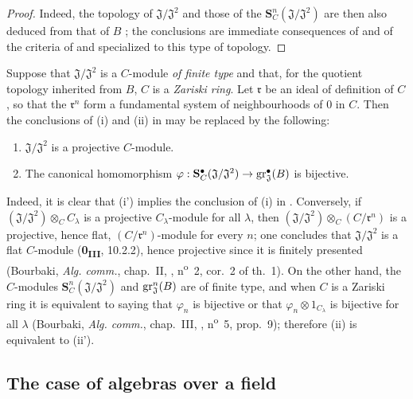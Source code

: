 \begin{proof}
Indeed, the topology of $\mathfrak{J}/\mathfrak{J}^2$ and those of the $\mathbf{S}_C^n(\mathfrak{J}/\mathfrak{J}^2)$ are then also deduced from that of $B$ ;
the conclusions are immediate consequences of  and of the criteria of  and  specialized to this type of topology.
\end{proof}

\begin{remark}[19.5.8]
\label{0.19.5.8}
Suppose that $\mathfrak{J}/\mathfrak{J}^2$ is a $C$-module \emph{of finite type} and that, for the quotient topology inherited from $B$, $C$ is a \emph{Zariski ring}.
Let $\mathfrak{r}$ be an ideal of definition of $C$, so that the $\mathfrak{r}^n$ form a fundamental system of neighbourhoods of $0$ in $C$.
Then the conclusions of {\rm(i)} and {\rm(ii)} in  may be replaced by the following:
\begin{enumerate}
  \item[\rm(i')] $\mathfrak{J}/\mathfrak{J}^2$ is a projective $C$-module.
  \item[\rm(ii')] The canonical homomorphism $\varphi:\mathbf{S}_C^\bullet(\mathfrak{J}/\mathfrak{J}^2)\to\operatorname{gr}_\mathfrak{J}^\bullet(B)$
  is bijective.
\end{enumerate}
Indeed, it is clear that {\rm(i')} implies the conclusion of {\rm(i)} in .
Conversely, if $(\mathfrak{J}/\mathfrak{J}^2)\otimes_C C_\lambda$ is a projective $C_\lambda$-module for all $\lambda$, then $(\mathfrak{J}/\mathfrak{J}^2)\otimes_C(C/\mathfrak{r}^n)$ is a projective, hence flat, $(C/\mathfrak{r}^n)$-module for every $n$;
one concludes that $\mathfrak{J}/\mathfrak{J}^2$ is a flat $C$-module (\textbf{0\textsubscript{III}}, 10.2.2), hence projective since it is finitely presented (Bourbaki, \emph{Alg. comm.}, chap.~II, , n\textsuperscript{o}~2, cor.~2 of th.~1).
On the other hand, the $C$-modules $\mathbf{S}_C^n(\mathfrak{J}/\mathfrak{J}^2)$ and $\operatorname{gr}_\mathfrak{J}^n(B)$ are of finite type, and when $C$ is a Zariski ring it is equivalent to saying that $\varphi_n$ is bijective or that $\varphi_n\otimes 1_{C_\lambda}$ is bijective for all $\lambda$ (Bourbaki, \emph{Alg. comm.}, chap.~III, , n\textsuperscript{o}~5, prop.~9);
therefore {\rm(ii)} is equivalent to {\rm(ii')}.
\end{remark}

\subsection{The case of algebras over a field}
\label{subsection:0.19.6}

